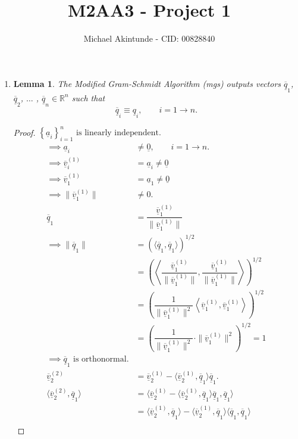 \documentclass{article}
\newcommand{\mgs}[1] {\underline{\overline{#1}}}
\newcommand{\cgs}[1] {\underline{#1}}
\newtheorem{theorem}{Lemma}
\begin{document}
\title{M2AA3 - Project 1}
\author{Michael Akintunde - CID: 00828840}

\maketitle

\begin{enumerate}
	\item 
	\begin{theorem}
	The Modified Gram-Schmidt Algorithm (mgs) outputs vectors $\mgs{q}_1$, $\mgs{q}_2$, $\ldots$ , $\mgs{q}_n \in \mathbb{R}^n$ such that $$\mgs{q}_i \equiv \cgs{q}_i, \qquad i = 1 \rightarrow n.$$
	\end{theorem}
	\begin{proof}
	$\left\{ \cgs{a}_i \right\}_{i=1}^n \text{ is linearly independent.}$
	\begin{align*}
		\implies \cgs{a}_i &\neq \underline{0} , \qquad i = 1 \rightarrow n. \\
		\implies \mgs{v}_i^{(1)} &= \cgs{a}_i \neq \underline{0} \\
		\implies \mgs{v}_1^{(1)} &= \cgs{a}_1 \neq \underline{0} \\
		\implies \|\mgs{v}_1^{(1)}\| &\neq 0. \\
		\mgs{q}_1 &= \dfrac{\mgs{v}_1^{(1)}}{\|\mgs{v}_1^{(1)}\|} \\
		\implies \|\mgs{q}_1\| &= \left( \langle \mgs{q}_1 , \mgs{q}_1 \rangle \right)^{1/2}	\\
		&= \left( \left\langle \dfrac{\mgs{v}_1^{(1)}}{\|\mgs{v}_1^{(1)}\|} , \dfrac{\mgs{v}_1^{(1)}}{\|\mgs{v}_1^{(1)}\|} \right\rangle \right)^{1/2} \\
		&= \left( \dfrac{1}{\|\mgs{v}_1^{(1)}\|^2} \left\langle \mgs{v}_1^{(1)} , \mgs{v}_1^{(1)} \right\rangle \right)^{1/2} \\
		&= \left( \dfrac{1}{\|\mgs{v}_1^{(1)}\|^2} \cdot  \|\mgs{v}_1^{(1)}\|^2 \right)^{1/2} = 1 \\
		\implies \mgs{q}_1 \text{ is orthonormal}.\\
		\mgs{v}_2^{(2)} &= \mgs{v}_2^{(1)} - \langle \mgs{v}_2^{(1)}, \mgs{q}_1 \rangle \mgs{q}_1. \\
		\langle \mgs{v}_2^{(2)}, \mgs{q}_1 \rangle 
		&= \langle \mgs{v}_2^{(1)} - \langle \mgs{v}_2^{(1)}, \mgs{q}_1 \rangle \mgs{q}_1, \mgs{q}_1 \rangle \\
		&= \langle \mgs{v}_2^{(1)}, \mgs{q}_1 \rangle - \langle \mgs{v}_2^{(1)}, \mgs{q}_1 \rangle \langle \mgs{q}_1, \mgs{q}_1 \rangle \\

\end{align*}
\end{proof}
\end{enumerate}
\end{document}
